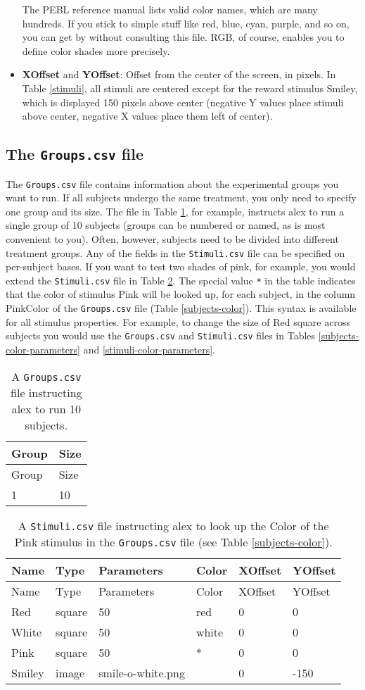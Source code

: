 \documentclass[11pt,]{article}
\begin{document}
\begin{itemize}
  The PEBL reference manual lists valid color names, which are many
  hundreds. If you stick to simple stuff like red, blue, cyan, purple,
  and so on, you can get by without consulting this file. RGB, of
  course, enables you to define color shades more precisely.
\item
  \textbf{XOffset} and \textbf{YOffset}: Offset from the center of the
  screen, in pixels. In Table \ref{stimuli}, all stimuli are centered
  except for the reward stimulus Smiley, which is displayed 150 pixels
  above center (negative Y values place stimuli above center, negative X
  values place them left of center).
\end{itemize}

\subsection{The \texttt{Groups.csv} file}\label{the-groups.csv-file}

The \texttt{Groups.csv} file contains information about the experimental
groups you want to run. If all subjects undergo the same treatment, you
only need to specify one group and its size. The file in Table
\ref{subjects}, for example, instructs alex to run a single group of 10
subjects (groups can be numbered or named, as is most convenient to
you). Often, however, subjects need to be divided into different
treatment groups. Any of the fields in the \texttt{Stimuli.csv} file can
be specified on per-subject bases. If you want to test two shades of
pink, for example, you would extend the \texttt{Stimuli.csv} file in
Table \ref{stimuli-color}. The special value \texttt{*} in the table
indicates that the color of stimulus Pink will be looked up, for each
subject, in the column PinkColor of the \texttt{Groups.csv} file (Table
\ref{subjects-color}). This syntax is available for all stimulus
properties. For example, to change the size of Red square across
subjects you would use the \texttt{Groups.csv} and \texttt{Stimuli.csv}
files in Tables \ref{subjects-color-parameters} and
\ref{stimuli-color-parameters}.

\begin{longtable}[c]{@{}ll@{}}
\caption{A \texttt{Groups.csv} file instructing alex to run 10 subjects.
\label{subjects}}\tabularnewline
\toprule
Group & Size\tabularnewline
\midrule
\endfirsthead
\toprule
Group & Size\tabularnewline
\midrule
\endhead
1 & 10\tabularnewline
\bottomrule
\end{longtable}

\begin{longtable}[c]{@{}llllll@{}}
\caption{A \texttt{Stimuli.csv} file instructing alex to look up the
Color of the Pink stimulus in the \texttt{Groups.csv} file (see Table
\ref{subjects-color}). \label{stimuli-color}}\tabularnewline
\toprule
Name & Type & Parameters & Color & XOffset & YOffset\tabularnewline
\midrule
\endfirsthead
\toprule
Name & Type & Parameters & Color & XOffset & YOffset\tabularnewline
\midrule
\endhead
Red & square & 50 & red & 0 & 0\tabularnewline
White & square & 50 & white & 0 & 0\tabularnewline
Pink & square & 50 & * & 0 & 0\tabularnewline
Smiley & image & smile-o-white.png & & 0 & -150\tabularnewline
\bottomrule
\end{longtable}
\end{document}
